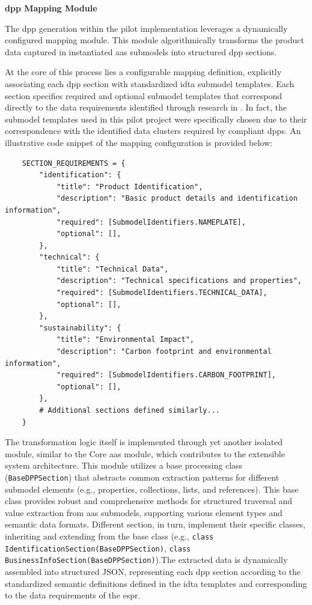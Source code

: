 \textbf{\ac{dpp} Mapping Module}

The \ac{dpp} generation within the pilot implementation leverages a dynamically configured mapping module. This module algorithmically transforms the product data captured in instantiated \ac{aas} submodels into structured \ac{dpp} sections.

At the core of this process lies a configurable mapping definition, explicitly associating each \ac{dpp} section with standardized \ac{idta} submodel templates. Each section specifies required and optional submodel templates that correspond directly to the data requirements identified through research in . In fact, the submodel templates used in this pilot project were specifically chosen due to their correspondence with the identified data clusters required by compliant \ac{dpp}s. An illustrative code snippet of the mapping configuration is provided below:
\\[2\baselineskip]

\begin{verbatim}
    SECTION_REQUIREMENTS = {
        "identification": {
            "title": "Product Identification",
            "description": "Basic product details and identification information",
            "required": [SubmodelIdentifiers.NAMEPLATE],
            "optional": [],
        },
        "technical": {
            "title": "Technical Data",
            "description": "Technical specifications and properties",
            "required": [SubmodelIdentifiers.TECHNICAL_DATA],
            "optional": [],
        },
        "sustainability": {
            "title": "Environmental Impact",
            "description": "Carbon footprint and environmental information",
            "required": [SubmodelIdentifiers.CARBON_FOOTPRINT],
            "optional": [],
        },
        # Additional sections defined similarly...
    }
\end{verbatim}

The transformation logic itself is implemented through yet another isolated module, similar to the Core \ac{aas} module, which contributes to the extensible system architecture. This module utilizes a base processing class (\verb|BaseDPPSection|) that abstracts common extraction patterns for different submodel elements (e.g., properties, collections, lists, and references). This base class provides robust and comprehensive methods for structured traversal and value extraction from \ac{aas} submodels, supporting various element types and semantic data formats. Different section, in turn, implement their specific classes, inheriting and extending from the base class (e.g., \verb|class IdentificationSection(BaseDPPSection)|, \verb|class BusinessInfoSection(BaseDPPSection)|).The extracted data is dynamically assembled into structured JSON, representing each \ac{dpp} section according to the standardized semantic definitions defined in the \ac{idta} templates and corresponding to the data requirements of the \ac{espr}.

